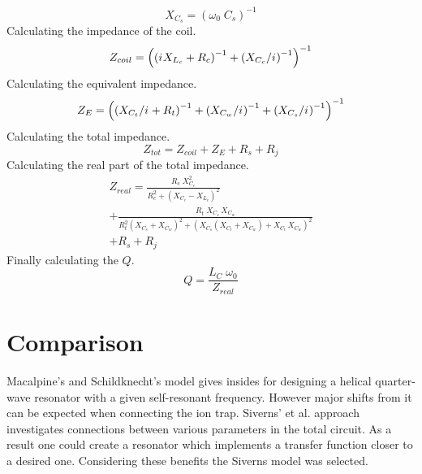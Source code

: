 \begin{equation}
	X_{C_s} = \left( \omega_0 \; C_s \right)^{-1}
\end{equation}
Calculating the impedance of the coil.
\begin{equation}
	Z_{coil} = \left( \left( {i\mkern1mu} X_{L_c} + R_c \right)^{-1} + \left( X_{C_c} / {i\mkern1mu} \right)^{-1} \right)^{-1}
\end{equation}
Calculating the equivalent impedance.
\begin{equation}
	Z_E = \left(  \left( X_{C_t}/{i\mkern1mu} + R_t \right)^{-1} + \left( X_{C_w}/{i\mkern1mu} \right)^{-1} + \left( X_{C_s}/{i\mkern1mu} \right)^{-1} \right)^{-1}
\end{equation}
Calculating the total impedance.
\begin{equation}
	Z_{tot} = Z_{coil} + Z_E + R_s + R_j
\end{equation}
Calculating the real part of the total impedance.
\begin{multline}
	Z_{real} = \frac{R_c \; X^2_{C_c}}{R^2_c + \left( X_{C_c} - X_{L_c} \right)^2}\\ 
	+ \frac{R_t \; X_{C_s} \, X_{C_w}}{R^2_t \left( X_{C_s} + X_{C_w} \right)^2 + \left( X_{C_s} \left( X_{C_t} + X_{C_w} \right) + X_{C_t} \, X_{C_w} \right)^2}\\
	+ R_s + R_j
\end{multline}
Finally calculating the $Q$.
\begin{equation}
	Q = \frac{L_C \; \omega_0}{Z_{real}}
\end{equation}








\section{Comparison}
Macalpine's and Schildknecht's \cite{Macalpine2000} model gives insides for designing a helical quarter-wave resonator with a given self-resonant frequency. However major shifts from it can be expected when connecting the ion trap. Siverns' et al. approach \cite{Siverns2012} investigates connections between various parameters in the total circuit. As a result one could create a resonator which implements a transfer function closer to a desired one. Considering these benefits the Siverns model \cite{Siverns2012} was selected.